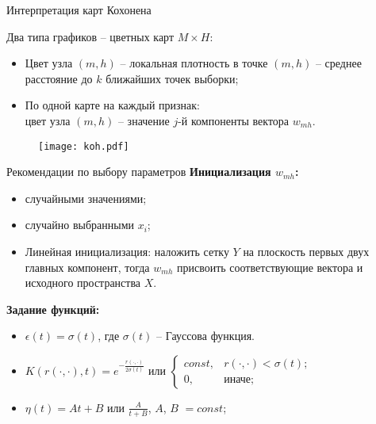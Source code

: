 \documentclass[unicode, notheorems, pdf]{beamer}
\begin{document}
\begin{frame}{Интерпретация карт Кохонена}
	
	Два типа графиков -- цветных карт $M\times H$:
	\begin{itemize}
		\item Цвет узла $(m,h)$ -- локальная плотность в точке $(m,h)$ -- среднее расстояние до $k$ ближайших точек выборки;

		\item По одной карте на каждый признак:\\
		цвет узла $(m,h)$ -- значение $j$-й компоненты вектора $w_{mh}.$
	\end{itemize}

	\vspace{.25cm}
	\begin{figure}
		\texttt{[image: koh.pdf]}
	\end{figure}
\end{frame}

\begin{frame}{Рекомендации по выбору параметров}
	\textbf{Инициализация $w_{mh}$:}
	\begin{itemize}
		\item случайными значениями;

		\vspace{.2cm}
		\item случайно выбранными $x_i$;

		\vspace{.2cm}
		\item Линейная инициализация: наложить сетку $Y$ на плоскость первых двух главных компонент, тогда $w_{mh}$ присвоить соответствующие вектора и исходного пространства $X$.
	\end{itemize}

	\pause
	\vspace{.5cm}
	\textbf{Задание функций:}
	\begin{itemize}
		\item $\epsilon(t)=\sigma(t)$, где $\sigma(t)$ -- Гауссова функция.

		\item $K(r(\cdot,\cdot),t)=e^{-\frac{r(\cdot,\cdot)}{2\sigma(t)}}$ или 
		$\left\{\begin{array}{ll}
			const, & r(\cdot,\cdot)<\sigma(t);\\
			0, & \text{иначе};
		\end{array}\right.$

		\item $\eta(t)=At+B$ или $\frac{A}{t+B}$, $A$, $B$ $=const$; 
	\end{itemize}
\end{frame}
\end{document}
